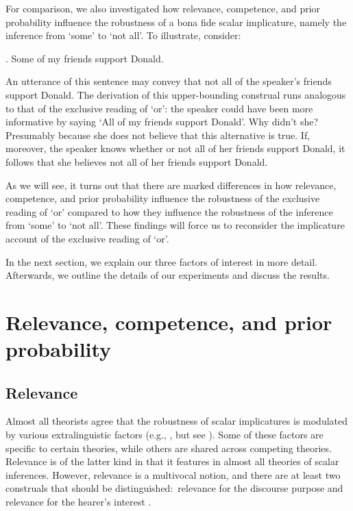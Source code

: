 \documentclass[12pt]{article}
\begin{document}
For comparison, we also investigated how relevance, competence, and prior probability influence the robustness of a bona fide scalar implicature, namely the inference from `some' to `not all'. To illustrate, consider:

\ex.	Some of my friends support Donald.

An utterance of this sentence may convey that not all of the speaker's friends support Donald. The derivation of this upper-bounding construal runs analogous to that of the exclusive reading of `or': the speaker could have been more informative by saying `All of my friends support Donald'. Why didn't she? Presumably because she does not believe that this alternative is true. If, moreover, the speaker knows whether or not all of her friends support Donald, it follows that she believes not all of her friends support Donald.

As we will see, it turns out that there are marked differences in how relevance, competence, and prior probability influence the robustness of the exclusive reading of `or' compared to how they influence the robustness of the inference from `some' to `not all'. These findings will force us to reconsider the implicature account of the exclusive reading of `or'.

In the next section, we explain our three factors of interest in more detail. Afterwards, we outline the details of our experiments and discuss the results.

\section{Relevance, competence, and prior probability}
\subsection*{Relevance}

Almost all theorists agree that the robustness of scalar implicatures is modulated by various extralinguistic factors (e.g., \citealt{chierchia2012, geurts2010, horn1972, franke2009}, but see \citealt{chierchia2004, levinson2000, storto2005}). Some of these factors are specific to certain theories, while others are shared across competing theories. Relevance is of the latter kind in that it features in almost all theories of scalar inferences. However, relevance is a multivocal notion, and there are at least two construals that should be distinguished:\ relevance for the discourse purpose and relevance for the hearer's interest \citep{geurts2010}.
\end{document}
